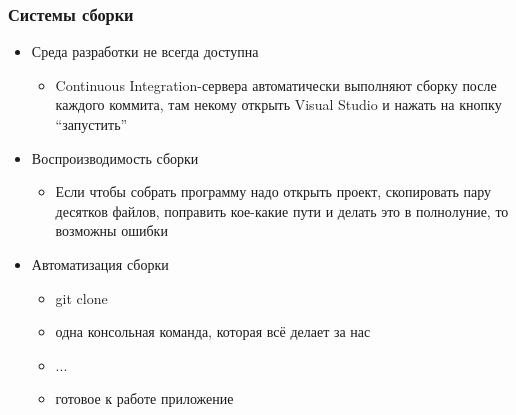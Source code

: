 \documentclass[xetex,mathserif,serif]{beamer}
\begin{document}
    \begin{frame}
        \frametitle{Системы сборки}
        \begin{itemize}
            \item Среда разработки не всегда доступна
            \begin{itemize}
                \item Continuous Integration-сервера автоматически выполняют сборку после каждого коммита, там некому открыть Visual Studio и нажать на кнопку ``запустить''
            \end{itemize}
            \item Воспроизводимость сборки
            \begin{itemize}
                \item Если чтобы собрать программу надо открыть проект, скопировать пару десятков файлов, поправить кое-какие пути и делать это в полнолуние, то возможны ошибки
            \end{itemize}
            \item Автоматизация сборки
            \begin{itemize}
                \item git clone
                \item одна консольная команда, которая всё делает за нас
                \item ...
                \item готовое к работе приложение
            \end{itemize}
        \end{itemize}
    \end{frame}
\end{document}
